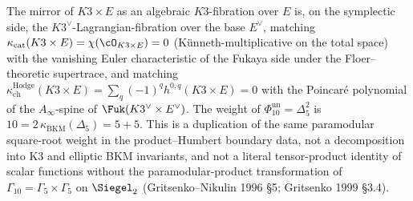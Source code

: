 \begin{remark}
The mirror of $K3\times E$ as an algebraic $K3$-fibration over
$E$ is, on the symplectic side, the
$K3^\vee$-Lagrangian-fibration over the base $E^\vee$, matching
$\kappa_{\mathrm{cat}}(K3\times E)=\chi(\cO_{K3\times E})=0$
\textup{(}K\"unneth-multiplicative on the total space\textup{)} with the vanishing
Euler characteristic of the Fukaya side under the Floer--theoretic
supertrace, and matching
$\kappa_{\mathrm{ch}}^{\mathrm{Hodge}}(K3\times E)=\sum_q(-1)^q h^{0,q}(K3\times E)=0$
with the Poincar\'e polynomial of the $A_\infty$-spine of
$\Fuk(K3^\vee\times E^\vee)$. The weight of
\(\Phi_{10}^{\mathrm{un}}=\Delta_5^2\) is
\(10=2\,\kappa_{\mathrm{BKM}}(\Delta_5)=5+5\). This is a duplication of
the same paramodular square-root weight in the product--Humbert
boundary data, not a decomposition into K3 and elliptic BKM invariants,
and not a literal tensor-product identity of scalar functions without
the paramodular-product transformation of
$\Gamma_{10}=\Gamma_5\times\Gamma_5$ on $\Siegel_2$
\textup{(}Gritsenko--Nikulin 1996 \S 5; Gritsenko 1999 \S 3.4\textup{)}.


\end{remark}
